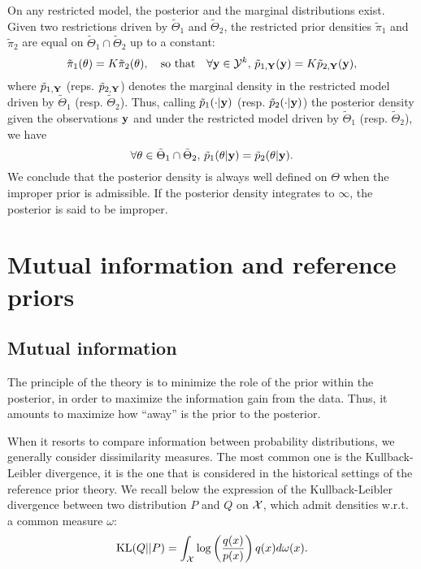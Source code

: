 On any restricted model, the posterior and the marginal distributions exist. 
Given two restrictions driven by $\tilde\Theta_1$ and $\tilde\Theta_2$, the restricted prior densities $\tilde\pi_1$ and $\tilde\pi_2$ are equal on $\tilde\Theta_1\cap\tilde\Theta_2$ up to a constant:
    \begin{equation}
        \tilde\pi_1(\theta) = K\tilde\pi_2(\theta),\quad\text{so that}\quad \forall \mathbf{y}\in\mathcal{Y}^k,\,\tilde p_{1,\mathbf{Y}}(\mathbf{y}) = K\tilde p_{2,\mathbf{Y}}(\mathbf{y}),
    \end{equation}
where $\tilde p_{1,\mathbf{Y}}$ (reps. $\tilde p_{2,\mathbf{Y}}$) denotes the marginal density in the restricted model driven by $\tilde\Theta_1$ (resp. $\tilde\Theta_2$). Thus, calling $\tilde p_1(\cdot | \mathbf{y})$ (resp. $\tilde p_2(\cdot | \mathbf{y})$) the posterior density given the observations $\mathbf{y}$ and under the restricted model driven by $\tilde\Theta_1$ (resp. $\tilde\Theta_2$), we have
    \begin{equation}
        \forall\theta\in\tilde\Theta_1\cap\tilde\Theta_2,\, \tilde p_1(\theta | \mathbf{y}) =\tilde p_2(\theta | \mathbf{y}).
    \end{equation}
We conclude that the posterior density is always well defined on $\Theta$ when the improper prior is admissible.
If the posterior density integrates to $\infty$, the posterior is said to be improper.





\section{Mutual information and reference priors}

\subsection{Mutual information}


The principle of the theory 
is to minimize the role of the prior within the posterior, in order to maximize the information gain from the data.
Thus, it amounts to maximize how ``away'' is the prior to the posterior.

When it resorts to compare information between probability distributions, we generally consider dissimilarity measures. The most common one is the Kullback-Leibler divergence, it is the one that is considered in the historical settings of the reference prior theory.
We recall below the expression of the Kullback-Leibler divergence between two distribution $P$ and $Q$ on $\mathcal{X}$, which admit densities w.r.t. a common measure $\omega$:
    \begin{equation}
        \text{KL}(Q||P)=\int_{\mathcal{X}}\log\left(\frac{q(x)}{p(x)}\right)q(x)d\omega(x).
    \end{equation}

